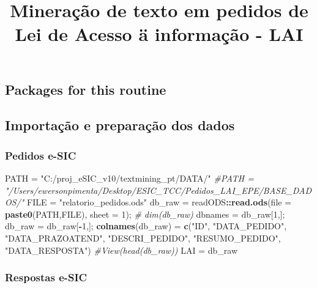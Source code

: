 \documentclass[]{article}
\title{Mineração de texto em pedidos de Lei de Acesso ä informação - LAI}
\author{}
\date{}
\newenvironment{Shaded}{\begin{snugshade}}{\end{snugshade}}
\newcommand{\KeywordTok}[1]{\textcolor[rgb]{0.13,0.29,0.53}{\textbf{#1}}}
\newcommand{\DataTypeTok}[1]{\textcolor[rgb]{0.13,0.29,0.53}{#1}}
\newcommand{\DecValTok}[1]{\textcolor[rgb]{0.00,0.00,0.81}{#1}}
\newcommand{\StringTok}[1]{\textcolor[rgb]{0.31,0.60,0.02}{#1}}
\newcommand{\CommentTok}[1]{\textcolor[rgb]{0.56,0.35,0.01}{\textit{#1}}}
\newcommand{\OperatorTok}[1]{\textcolor[rgb]{0.81,0.36,0.00}{\textbf{#1}}}
\newcommand{\NormalTok}[1]{#1}
\begin{document}
\maketitle

\subsection{Packages for this routine}\label{packages-for-this-routine}

\subsection{Importação e preparação dos
dados}\label{importacao-e-preparacao-dos-dados}

\subsubsection{Pedidos e-SIC}\label{pedidos-e-sic}

\begin{Shaded}
\begin{Highlighting}[]
\NormalTok{PATH =}\StringTok{ "C:/proj_eSIC_v10/textmining_pt/DATA/"}
\CommentTok{#PATH = "/Users/ewersonpimenta/Desktop/ESIC_TCC/Pedidos_LAI_EPE/BASE_DADOS/"}
\NormalTok{FILE =}\StringTok{ "relatorio_pedidos.ods"}
\NormalTok{db_raw =}\StringTok{ }\NormalTok{readODS}\OperatorTok{::}\KeywordTok{read.ods}\NormalTok{(}\DataTypeTok{file =} \KeywordTok{paste0}\NormalTok{(PATH,FILE), }\DataTypeTok{sheet =} \DecValTok{1}\NormalTok{); }\CommentTok{# dim(db_raw)}
\NormalTok{dbnames =}\StringTok{ }\NormalTok{db_raw[}\DecValTok{1}\NormalTok{,]; db_raw =}\StringTok{ }\NormalTok{db_raw[}\OperatorTok{-}\DecValTok{1}\NormalTok{,]; }
\KeywordTok{colnames}\NormalTok{(db_raw) =}\StringTok{ }\KeywordTok{c}\NormalTok{(}\StringTok{"ID"}\NormalTok{, }\StringTok{"DATA_PEDIDO"}\NormalTok{, }\StringTok{"DATA_PRAZOATEND"}\NormalTok{, }\StringTok{"DESCRI_PEDIDO"}\NormalTok{,}
                     \StringTok{"RESUMO_PEDIDO"}\NormalTok{, }\StringTok{"DATA_RESPOSTA"}\NormalTok{)}
\CommentTok{#View(head(db_raw))}
\NormalTok{LAI =}\StringTok{ }\NormalTok{db_raw}
\end{Highlighting}
\end{Shaded}

\subsubsection{Respostas e-SIC}\label{respostas-e-sic}
\end{document}
